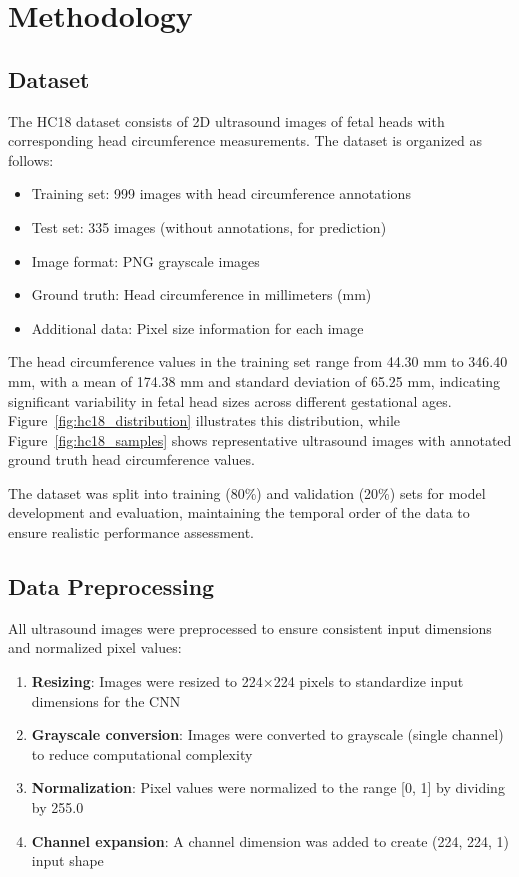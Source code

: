 \documentclass[conference]{IEEEtran}
\begin{document}
\section{Methodology}

\subsection{Dataset}

The HC18 dataset consists of 2D ultrasound images of fetal heads with corresponding head circumference measurements. The dataset is organized as follows:
\begin{itemize}
    \item Training set: 999 images with head circumference annotations
    \item Test set: 335 images (without annotations, for prediction)
    \item Image format: PNG grayscale images
    \item Ground truth: Head circumference in millimeters (mm)
    \item Additional data: Pixel size information for each image
\end{itemize}

The head circumference values in the training set range from 44.30 mm to 346.40 mm, with a mean of 174.38 mm and standard deviation of 65.25 mm, indicating significant variability in fetal head sizes across different gestational ages. Figure~\ref{fig:hc18_distribution} illustrates this distribution, while Figure~\ref{fig:hc18_samples} shows representative ultrasound images with annotated ground truth head circumference values.

The dataset was split into training (80\%) and validation (20\%) sets for model development and evaluation, maintaining the temporal order of the data to ensure realistic performance assessment.

\subsection{Data Preprocessing}

All ultrasound images were preprocessed to ensure consistent input dimensions and normalized pixel values:

\begin{enumerate}
    \item \textbf{Resizing}: Images were resized to 224×224 pixels to standardize input dimensions for the CNN
    \item \textbf{Grayscale conversion}: Images were converted to grayscale (single channel) to reduce computational complexity
    \item \textbf{Normalization}: Pixel values were normalized to the range [0, 1] by dividing by 255.0
    \item \textbf{Channel expansion}: A channel dimension was added to create (224, 224, 1) input shape
\end{enumerate}
\end{document}
